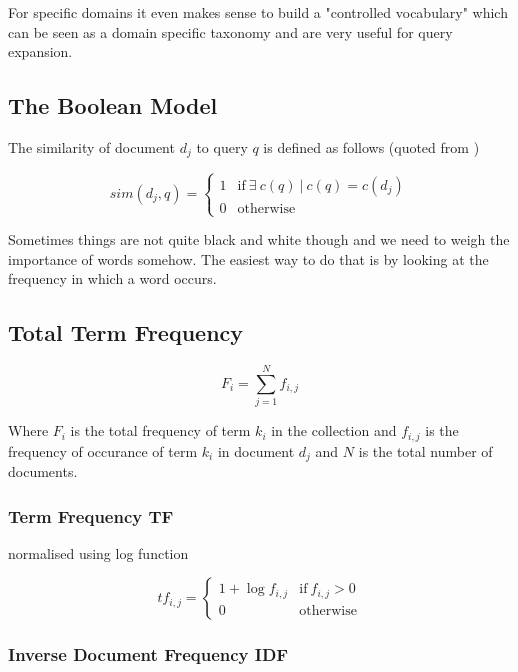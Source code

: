 For specific domains it even makes sense to build a "controlled vocabulary" which can be seen as a domain specific taxonomy and are very useful for query expansion.

\subsection{The Boolean Model}

The similarity of document $d_j$ to query $q$ is defined as follows (quoted from \citep[p.65]{Baeza-Yates2011})

\begin{equation}
sim\left(d_j,q\right) =
\begin{cases}
1 & \text{if} \ \exists \ c\left(q\right) \ | \ c\left(q\right) = c\left(d_j\right)\\
0 & \text{otherwise}
\end{cases}
\end{equation}

Sometimes things are not quite black and white though and we need to weigh the importance of words somehow. The easiest way to do that is by looking at the frequency in which a word occurs.

\subsection{Total Term Frequency}

\begin{equation}
F_i =
\sum_{j=1}^{N}f_{i,j}
\end{equation}

Where $F_i$ is the total frequency of term $k_i$ in the collection and $f_{i,j}$ is the frequency of occurance of term $k_i$ in document $d_j$ and $N$ is the total number of documents.

\subsubsection{Term Frequency TF}

normalised using log function

\begin{equation}
tf_{i,j}=
\begin{cases}
1+\log f_{i,j} & \text{if} \ f_{i,j} > 0\\
0 & \text{otherwise}
\end{cases}
\end{equation}

\subsubsection{Inverse Document Frequency IDF}

